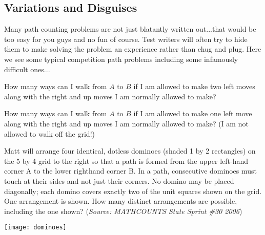     \clearpage
	\subsection{Variations and Disguises}
		Many path counting problems are not just blatantly written out...that would be too easy for you guys and no fun of course. Test writers will often try to hide them to make solving the problem an experience rather than chug and plug. Here we see some typical competition path problems including some infamously difficult ones...
		
		\begin{problem}
		How many ways can I walk from $A$ to $B$ if I am allowed to make two left moves along with the right and up moves I am normally allowed to make?
		\begin{center}
        \end{center}
        \end{problem}
        
        \begin{problem}
		How many ways can I walk from $A$ to $B$ if I am allowed to make one left move along with the right and up moves I am normally allowed to make? (I am not allowed to walk off the grid!)
		\begin{center}
        \end{center}
        \end{problem}
		
		\begin{problem}
		Matt will arrange four identical, dotless dominoes (shaded 1 by 2 rectangles) on the 5 by 4 grid to the right so that a path is formed from the upper left-hand corner A to the lower righthand corner B. In a path, consecutive dominoes must touch at their sides and not just their corners. No domino may be placed diagonally; each domino covers exactly two of the unit squares shown on the grid. One arrangement is shown. How many distinct arrangements are possible, including the one shown? (\textit{Source: MATHCOUNTS State Sprint \#30 2006})
		\begin{center}
        \texttt{[image: dominoes]}
        \end{center}
		\end{problem}
		
